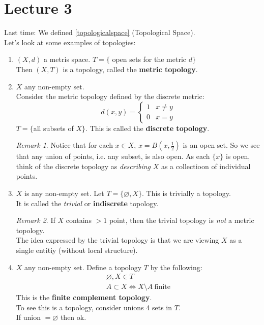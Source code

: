 \documentclass{article}
\renewcommand{\emptyset}{\varnothing}
\theoremstyle{remark}
\theoremstyle{example}
\theoremstyle{examples}
\newtheorem*{remark}{Remark}
\begin{document}
	\section*{Lecture 3}
	Last time: We defined \ref{topologicalspace} (Topological Space).\\
	Let's look at some examples of topologies:
	\begin{enumerate}
		\item $(X,d)$ a metris space. $T = \{$ open sets for the metric $d \}$\\
		Then $(X,T)$ is a topology, called the \textbf{metric topology}.
		\item $X$ any non-empty set.\\
		Consider the metric topology defined by the discrete metric: \[d(x,y)=\begin{cases}
			1 & x \neq y\\
			0 & x = y
		\end{cases}\]
		$T = \{$all subsets of $X\}$. This is called the \textbf{discrete topology}.
		\begin{remark}
			Notice that for each $x \in X$, ${x}=B(x,\frac12)$ is an open set. So we see that any union of points, i.e. any subset, is also open. As each $\{x\}$ is open, think of the discrete topology as \textit{describing} $X$ as a collectioon of individual points.
		\end{remark}
		\item $X$ is any non-empty set. Let $T=\{ \emptyset, X \}$. This is trivially a topology.\\
		It is called the \textit{trivial} or \textbf{indiscrete} topology.
		\begin{remark}
			If $X$ contains $>1$ point, then the trivial topology is \textit{not} a metric topology.\\
			The idea expressed by the trivial topology is that we are viewing $X$ as a single entitiy (without local structure).
		\end{remark}
		\item $X$ any non-empty set. Define a topology $T$ by the following:
		\begin{eqnarray}
			\emptyset, X \in T\\
			A \subset X \iff X \setminus A\ \mathrm{finite} 
		\end{eqnarray}
		This is the \textbf{finite complement topology}.\\
		To see this is a topology, consider unions 4 sets in $T$.\\
		If union $= \emptyset$ then ok.\\

\end{enumerate}
\end{document}
